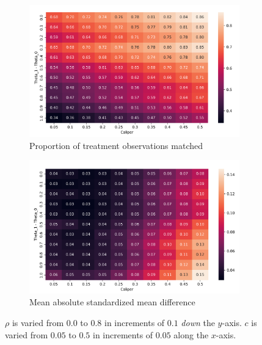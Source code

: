\documentclass[11pt]{extarticle}
\begin{document}
\begin{figure}[h!]
  \centering
  \begin{center}
    \begin{subfigure}[t]{0.49\textwidth}
        \centering
        \includegraphics[width=\textwidth]{./img/output30/caliper_vs_imbalance_big/plots/theta1_caliper_prop1_match.png}
        \caption{Proportion of treatment observations matched}
        \label{subfig:exp1_nmatch}
    \end{subfigure}
    \begin{subfigure}[t]{0.49\textwidth}
        \centering
        \includegraphics[width=\textwidth]{./img/output30/caliper_vs_imbalance_big/plots/theta1_caliper_mean_abs_smd.png}
        \caption{Mean absolute standardized mean difference}
        \label{subfig:exp1_mean_abs_smd}
    \end{subfigure}
    \caption{$\rho$ is varied from $0.0$ to $0.8$ in increments of $0.1$ \emph{down} the $y$-axis. $c$ is varied from $0.05$ to $0.5$ in increments of $0.05$ along the $x$-axis.}
  \end{center}
\end{figure}
\end{document}
